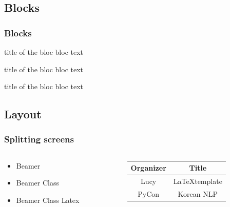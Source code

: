 \documentclass[compress]{beamer}
\begin{document}
\subsection{Blocks}
\begin{frame}\frametitle{Blocks}
    \begin{block}{title of the bloc}
        bloc text
    \end{block}
    \begin{exampleblock}{title of the bloc}
        bloc text
    \end{exampleblock}
    \begin{alertblock}{title of the bloc}
        bloc text
    \end{alertblock}
\end{frame}

\subsection{Layout}
\begin{frame}\frametitle{Splitting screens}
    \begin{columns}
        \begin{column}{5cm}
            \begin{itemize}
                \item Beamer
                \item Beamer Class
                \item Beamer Class Latex
            \end{itemize}
        \end{column}
        \begin{column}{5cm}
            \begin{tabular}{|c|c|}
                \hline
                \textbf{Organizer} & \textbf{Title} \\ \hline
                Lucy &  \LaTeX template \\ \hline
                PyCon & Korean NLP \\
                \hline
            \end{tabular}
        \end{column}
    \end{columns}
\end{frame}
\end{document}

